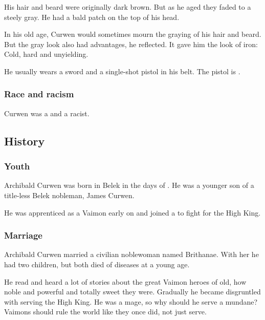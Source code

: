 His hair and beard were originally dark brown. 
But as he aged they faded to a steely gray. 
He had a bald patch on the top of his head. 

In his old age, Curwen would sometimes mourn the graying of his hair and beard. 
But the gray look also had advantages, he reflected. 
It gave him the look of iron: 
Cold, hard and unyielding. 

He usually wears a sword and a single-shot pistol in his belt. 
The pistol is . 





\subsubsection{Race and racism}
Curwen was a \truehuman and a racist.









\subsection{History}





\subsubsection{Youth}
Archibald Curwen was born in Belek in the days of . 
He was a younger son of a title-less Belek nobleman, James Curwen. 

He was apprenticed as a Vaimon early on and joined a \Velcadian{} \ishrah{} to fight for the High King. 






\subsubsection{Marriage}
Archibald Curwen married a civilian noblewoman named Brithanae. 
With her he had two children, but both died of diseases at a young age. 

He read and heard a lot of stories about the great Vaimon heroes of old, how noble and powerful and totally sweet they were. 
Gradually he became disgruntled with serving the High King. 
He was a mage, so why should he serve a mundane? 
Vaimons should rule the world like they once did, not just serve. 






